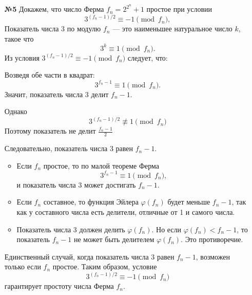 \documentclass[a4paper]{article}
\begin{document}
\begin{enumerate}
    \item[\textbf{№5}]Докажем, что число Ферма \( f_n = 2^{2^n} + 1 \) простое при условии 
    \[
    3^{(f_n-1)/2} \equiv -1 \pmod{f_n},
    \]
    Показатель числа 3 по модулю \( f_n \) — это наименьшее натуральное число \( k \), такое что 
    \[
    3^k \equiv 1 \pmod{f_n}.
    \]
    Из условия \( 3^{(f_n-1)/2} \equiv -1 \pmod{f_n} \) следует, что:
   
    Возведя обе части в квадрат: 
    \[
    3^{f_n-1} \equiv 1 \pmod{f_n}.
    \]
    Значит, показатель числа 3 делит \( f_n - 1 \).
    
    Однако 
    \[ 3^{(f_n-1)/2} \not\equiv 1 \pmod{f_n} \]
    Поэтому показатель не делит \( \frac{f_n-1}{2} \)
    
    Следовательно, показатель числа 3 равен \( f_n - 1 \).

    \begin{itemize}
        \item Если \( f_n \) простое, то по малой теореме Ферма 
        \[
        3^{f_n-1} \equiv 1 \pmod{f_n},
        \]
        и показатель числа 3 может достигать \( f_n - 1 \).
        \item Если \( f_n \) составное, то функция Эйлера \( \varphi(f_n) \) будет меньше \( f_n - 1 \), так как у составного числа есть делители, отличные от 1 и самого числа.
        \item Показатель числа 3 должен делить \( \varphi(f_n) \). Но если \( \varphi(f_n) < f_n - 1 \), то показатель \( f_n - 1 \) не может быть делителем \( \varphi(f_n) \). Это противоречие.
    \end{itemize}

    Единственный случай, когда показатель числа 3 равен \( f_n - 1 \), возможен только если \( f_n \) простое. Таким образом, условие 
    \[
    3^{(f_n-1)/2} \equiv -1 \pmod{f_n}
    \]
    гарантирует простоту числа Ферма \( f_n \).

\end{enumerate}
\end{document}
